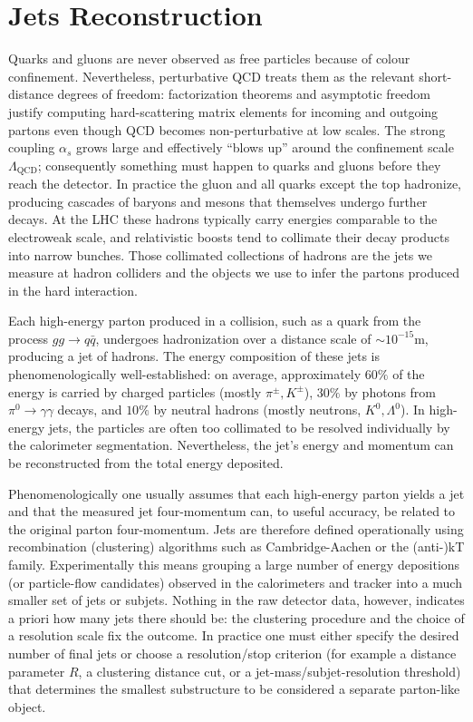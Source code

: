 \section{Jets Reconstruction}\label{sec:jets}

Quarks and gluons are never observed as free particles because of colour confinement. Nevertheless, perturbative QCD treats them as the relevant short-distance degrees of freedom: factorization theorems and asymptotic freedom justify computing hard-scattering matrix elements for incoming and outgoing partons even though QCD becomes non-perturbative at low scales. The strong coupling \(\alpha_s\) grows large and effectively ``blows up'' around the confinement scale \(\Lambda_{\mathrm{QCD}}\); consequently something must happen to quarks and gluons before they reach the detector. In practice the gluon and all quarks except the top hadronize, producing cascades of baryons and mesons that themselves undergo further decays. At the LHC these hadrons typically carry energies comparable to the electroweak scale, and relativistic boosts tend to collimate their decay products into narrow bunches. Those collimated collections of hadrons are the jets we measure at hadron colliders and the objects we use to infer the partons produced in the hard interaction.

Each high-energy parton produced in a collision, such as a quark from the process $gg \rightarrow q\bar{q}$, undergoes hadronization over a distance scale of $\sim10^{-15}\mathrm{m}$, producing a jet of hadrons. The energy composition of these jets is phenomenologically well-established: on average, approximately $60\%$ of the energy is carried by charged particles (mostly $\pi^{\pm}, K^{\pm}$), $30\%$ by photons from $\pi^0 \rightarrow \gamma\gamma$ decays, and $10\%$ by neutral hadrons (mostly neutrons, $K^0, \Lambda^0$). In high-energy jets, the particles are often too collimated to be resolved individually by the calorimeter segmentation. Nevertheless, the jet's energy and momentum can be reconstructed from the total energy deposited.

Phenomenologically one usually assumes that each high-energy parton yields a jet and that the measured jet four-momentum can, to useful accuracy, be related to the original parton four-momentum. Jets are therefore defined operationally using recombination (clustering) algorithms such as Cambridge-Aachen or the (anti-)kT family. Experimentally this means grouping a large number of energy depositions (or particle-flow candidates) observed in the calorimeters and tracker into a much smaller set of jets or subjets. Nothing in the raw detector data, however, indicates a priori how many jets there should be: the clustering procedure and the choice of a resolution scale fix the outcome. In practice one must either specify the desired number of final jets or choose a resolution/stop criterion (for example a distance parameter \(R\), a clustering distance cut, or a jet-mass/subjet-resolution threshold) that determines the smallest substructure to be considered a separate parton-like object.

